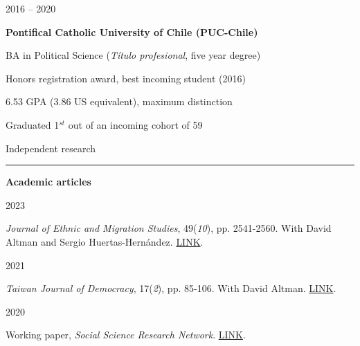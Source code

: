 \documentclass[a4paper, 12pt]{article}
\begin{document}
\begin{multicols}{2}

2016 -- 2020
\columnbreak

\textbf{Pontifical Catholic University of Chile (PUC-Chile)}
\medskip

BA in Political Science (\textit{Título profesional}, five year degree)

Honors registration award, best incoming student (2016)

6.53 GPA (3.86 US equivalent), maximum distinction

Graduated 1$^{st}$ out of an incoming cohort of 59

\end{multicols}




\large Independent research
\smallskip
\hrule
\normalsize


\bigskip
\textbf{Academic articles}


\begin{multicols}{2}

2023

\columnbreak

 \textit{Journal of Ethnic and Migration Studies}, 49(\textit{10}), pp. 2541-2560. With David Altman and Sergio Huertas-Hernández. \href{https://www.tandfonline.com/doi/full/10.1080/1369183X.2023.2182713}{LINK}.

\end{multicols}


\begin{multicols}{2}

2021

\columnbreak

 \textit{Taiwan Journal of Democracy}, 17(\textit{2}), pp. 85-106. With David Altman. \href{https://www.tfd.org.tw/en/publication/journal}{LINK}.

\end{multicols}


\begin{multicols}{2}

2020

\columnbreak

 Working paper, \textit{Social Science Research Network}. \href{https://ssrn.com/abstract=3866860}{LINK}.

\end{multicols}
\end{document}
